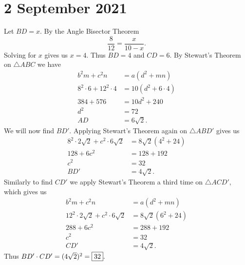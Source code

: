 \documentclass[letterpaper,oneside]{scrartcl}
\begin{document}
\section*{2 September 2021}
Let $BD =x.$ By the Angle Bisector Theorem
$$\frac{8}{12} = \frac{x}{10-x}.$$
Solving for $x$ gives us $x=4.$ Thus $BD=4$ and $CD=6.$ By Stewart's Theorem on $\triangle ABC$ we have
\begin{align*}
    b^2m+c^2n            & =a(d^2+mn)       \\
    8^2\cdot6+12^2\cdot4 & =10(d^2+6\cdot4) \\
    384+576              & =10d^2+240       \\
    d^2                  & =72              \\
    AD                   & =6\sqrt2.
\end{align*}
We will now find $BD'$. Applying Stewart's Theorem again on $\triangle ABD'$ gives us
\begin{align*}
    8^2\cdot2\sqrt2+c^2\cdot6\sqrt2 & =8\sqrt2(4^2+24) \\
    128+6c^2                        & =128+192         \\
    c^2                             & =32              \\
    BD'                             & =4\sqrt2.
\end{align*}
Similarly to find $CD'$ we apply Stewart's Theorem a third time on $\triangle ACD',$ which gives us
\begin{align*}
    b^2m+c^2n                        & =a(d^2+mn)       \\
    12^2\cdot2\sqrt2+c^2\cdot6\sqrt2 & =8\sqrt2(6^2+24) \\
    288+6c^2                         & =288+192         \\
    c^2                              & =32              \\
    CD'                              & =4\sqrt2.
\end{align*}
Thus $BD'\cdot CD' = (4\sqrt2)^2=\fbox{32}.$
\newpage
\end{document}
